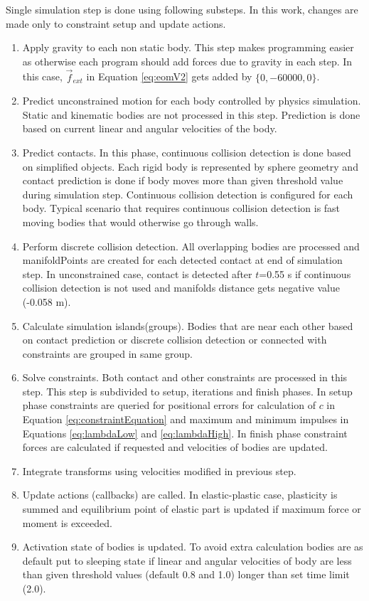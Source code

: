 Single simulation step is done using following substeps. 
In this work, changes are made only to constraint setup and update actions.
\begin{enumerate}
\item Apply gravity to each non static body. 
This step makes programming easier as otherwise each program should add forces due to gravity in each step. 
In this case, $\vec{f}_{ext}$ in  Equation \ref{eq:eomV2} gets added by $\lbrace{0,-60000,0}\rbrace$.
\item Predict unconstrained motion for each body controlled by physics simulation.
Static and kinematic bodies are not processed in this step.
Prediction is done based on current linear and angular velocities of the body.
\item Predict contacts. In this phase, continuous collision detection is done based on simplified objects. 
Each rigid body is represented by sphere geometry and contact prediction is done if body moves more than given threshold value during simulation step. Continuous collision detection is configured for each body. 
Typical scenario that requires continuous collision detection is fast moving bodies that would otherwise go through walls.
\item Perform discrete collision detection. All overlapping bodies are processed and manifoldPoints are created for
each detected contact at end of simulation step. 
In unconstrained case, contact is detected after $t$=0.55 s if continuous collision detection is not used and manifolds distance gets negative value (-0.058 m).
\item Calculate simulation islands(groups). Bodies that are near each other based on contact prediction or discrete collision detection
 or connected with constraints are grouped in same group.
\item Solve constraints. Both contact and other constraints are processed in this step. 
 This step is subdivided to setup, iterations and finish phases. 
In setup phase constraints are queried for positional errors for calculation of $c$ in
Equation \ref{eq:constraintEquation} and maximum and minimum impulses in Equations \ref{eq:lambdaLow} and 
\ref{eq:lambdaHigh}.
In finish phase constraint forces are calculated if requested and velocities of bodies are updated.
\item Integrate transforms using velocities modified in previous step.
\item Update actions (callbacks) are called. 
In elastic-plastic case, plasticity is summed and equilibrium point of elastic part is updated if maximum force or moment is exceeded.
\item Activation state of bodies is updated. 
To avoid extra calculation bodies are as default put to sleeping state if linear and angular velocities of body are less than
given threshold values (default 0.8 and 1.0) longer than set time limit (2.0).
\end{enumerate} 

